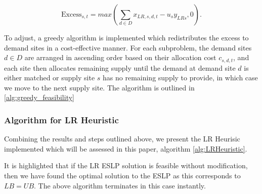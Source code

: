 \begin{equation}
    \text{Excess}_{s,t} = max(\sum_{d \in D}^{} x_{LR, s,d,t} - u_sy_{LR s}, 0).
\end{equation}


To adjust, a greedy algorithm is implemented which redistributes the excess to demand sites in a cost-effective
manner. For each subproblem, the demand sites $d \in D$ are arranged in ascending order based on 
their allocation cost $c_{s, d, t}$, and each site then allocates remaining supply until the demand at demand site $d$  
is either matched or supply site $s$ has no remaining supply to provide, in which case we move to the 
next supply site. The algorithm is outlined in \ref{alg:greedy_feasibility}



\subsubsection{Algorithm for LR Heuristic}

Combining the results and steps outlined above, we present the LR Heurisic implemented which
will be assessed in this paper, algorithm \ref{alg:LRHeuristic}.



It is highlighted that if the LR ESLP solution is feasible without modification, then we have found the
optimal solution to the ESLP as this corresponds to $LB = UB$. 
The above algorithm terminates in this case instantly.

\newpage
